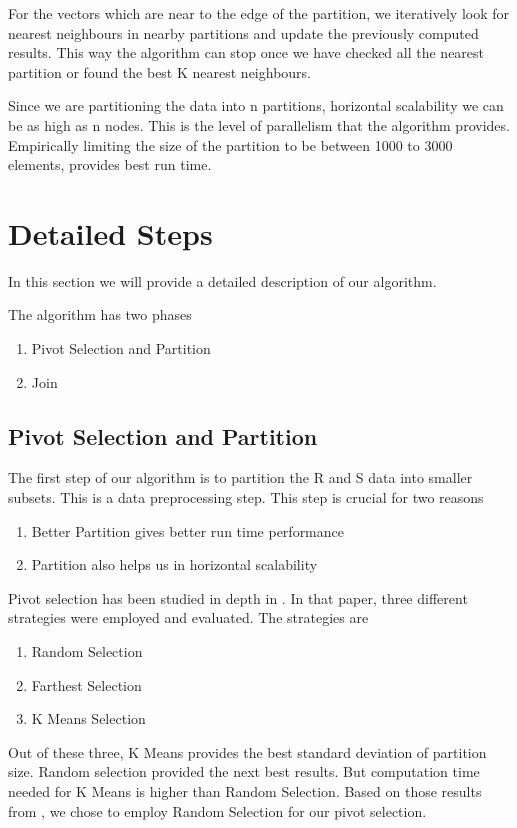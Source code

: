 For the vectors which are near to the edge of the partition, we
iteratively look for nearest neighbours in nearby partitions and
update the previously computed results. This way the algorithm can
stop once we have checked all the nearest partition or found the best
K nearest neighbours.

Since we are partitioning the data into n partitions, horizontal scalability we can
be as high as n nodes. This is the level of parallelism that
the algorithm provides. Empirically limiting the size of the
partition to be between 1000 to 3000 elements, provides best run time.

\section{Detailed Steps}

In this section we will provide a detailed description of our
algorithm.

The algorithm has two phases
\begin{enumerate}
\item Pivot Selection and Partition
\item Join
\end{enumerate}

\subsection{Pivot Selection and Partition}
The first step of our algorithm is to partition the R and S data into smaller
subsets. This is a data preprocessing step. This step is crucial for
two reasons

\begin{enumerate}
\item Better Partition gives better run time performance
\item Partition also helps us in horizontal scalability
\end{enumerate}

Pivot selection has been studied in depth in \cite{lu_efficient_2012}.
In that paper, three different strategies were employed and
evaluated. The strategies are
\begin{enumerate}
\item Random Selection
\item Farthest Selection
\item K Means Selection
\end{enumerate}

Out of these three, K Means provides the best standard deviation of
partition size. Random selection provided the next best results. But
computation time needed for K Means is higher than Random
Selection. Based on those results from \cite{lu_efficient_2012}, we
chose to employ Random Selection for our pivot selection.

